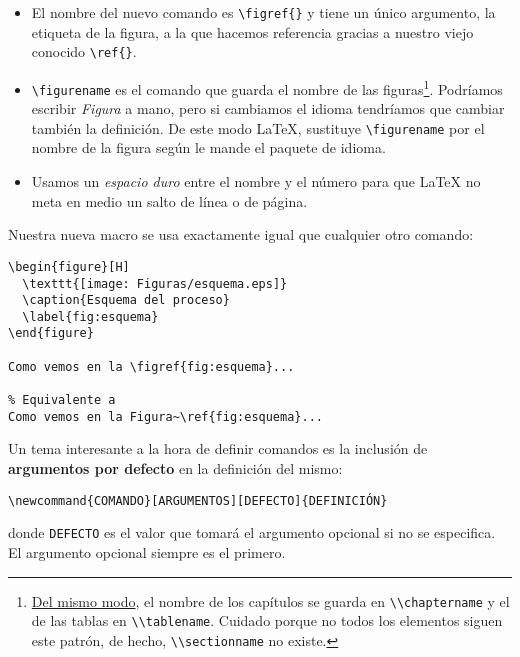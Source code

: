 \begin{itemize}
\item
  El nombre del nuevo comando es \lstinline!\figref{}! y tiene un único
  argumento, la etiqueta de la figura, a la que hacemos referencia
  gracias a nuestro viejo conocido \lstinline!\ref{}!.
\item
  \lstinline!\figurename! es el comando que guarda el nombre de las
  figuras\footnote{\href{http://www.tex.ac.uk/FAQ-fixnam.html}{Del mismo
    modo}, el nombre de los capítulos se guarda en
    \lstinline!\\chaptername! y el de las tablas en
    \lstinline!\\tablename!. Cuidado porque no todos los elementos siguen
    este patrón, de hecho, \lstinline!\\sectionname! no existe.}.
  Podríamos escribir \emph{Figura} a mano, pero si cambiamos el idioma
  tendríamos que cambiar también la definición. De este modo LaTeX,
  sustituye \lstinline!\figurename! por el nombre de la figura según le
  mande el paquete de idioma.
\item
  Usamos un \emph{espacio duro} entre el nombre y el número para que
  LaTeX no meta en medio un salto de línea o de página.
\end{itemize}

Nuestra nueva macro se usa exactamente igual que cualquier otro comando:

\begin{lstlisting}[language={[latex]tex}]
\begin{figure}[H]
  \texttt{[image: Figuras/esquema.eps]}
  \caption{Esquema del proceso}
  \label{fig:esquema}
\end{figure}

Como vemos en la \figref{fig:esquema}...

% Equivalente a 
Como vemos en la Figura~\ref{fig:esquema}...
\end{lstlisting}

Un tema interesante a la hora de definir comandos es la inclusión de
\textbf{argumentos por defecto} en la definición del mismo:

\begin{lstlisting}[language={[latex]tex}]
\newcommand{COMANDO}[ARGUMENTOS][DEFECTO]{DEFINICIÓN}
\end{lstlisting}

donde \lstinline!DEFECTO! es el valor que tomará el argumento opcional
si no se especifica. El argumento opcional siempre es el primero.

